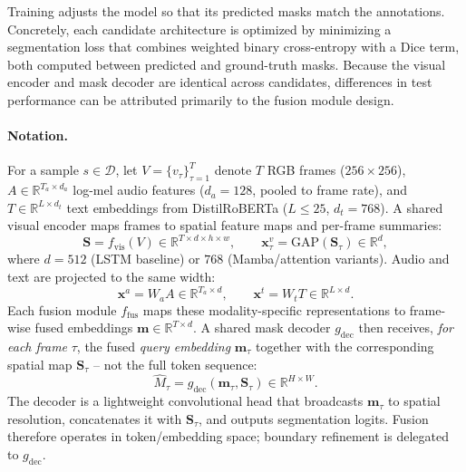 \documentclass[a4paper,12pt]{extarticle}
\begin{document}
Training adjusts the model so that its predicted masks match the annotations. Concretely, each candidate architecture is optimized by minimizing a segmentation loss that combines weighted binary cross-entropy with a Dice term, both computed between predicted and ground-truth masks. Because the visual encoder and mask decoder are identical across candidates, differences in test performance can be attributed primarily to the fusion module design.

\paragraph{Notation.}
For a sample $s \in \mathcal{D}$, let $V=\{v_\tau\}_{\tau=1}^{T}$ denote $T$ RGB frames ($256{\times}256$), $A \in \mathbb{R}^{T_a \times d_a}$ log-mel audio features ($d_a{=}128$, pooled to frame rate), and $T \in \mathbb{R}^{L \times d_t}$ text embeddings from DistilRoBERTa ($L{\le}25$, $d_t{=}768$). A shared visual encoder maps frames to spatial feature maps and per-frame summaries:
\begin{equation}
    \mathbf{S} = f_{\mathrm{vis}}(V) \in \mathbb{R}^{T \times d \times h \times w}, \qquad
    \mathbf{x}^{v}_\tau = \mathrm{GAP}(\mathbf{S}_\tau) \in \mathbb{R}^{d},
\end{equation}
where $d{=}512$ (LSTM baseline) or $768$ (Mamba/attention variants). Audio and text are projected to the same width:
\begin{equation}
    \mathbf{x}^{a} = W_a A \in \mathbb{R}^{T_a \times d}, \qquad
    \mathbf{x}^{t} = W_t T \in \mathbb{R}^{L \times d}.
\end{equation}
Each fusion module $f_{\mathrm{fus}}$ maps these modality-specific representations to frame-wise fused embeddings $\mathbf{m} \in \mathbb{R}^{T \times d}$. A shared mask decoder $g_{\mathrm{dec}}$ then receives, \emph{for each frame} $\tau$, the fused \emph{query embedding} $\mathbf{m}_\tau$ together with the corresponding spatial map $\mathbf{S}_\tau$ -- not the full token sequence:
\begin{equation}
    \hat{M}_\tau = g_{\mathrm{dec}}(\mathbf{m}_\tau, \mathbf{S}_\tau) \in \mathbb{R}^{H \times W}.
\end{equation}
The decoder is a lightweight convolutional head that broadcasts $\mathbf{m}_\tau$ to spatial resolution, concatenates it with $\mathbf{S}_\tau$, and outputs segmentation logits. Fusion therefore operates in token/embedding space; boundary refinement is delegated to $g_{\mathrm{dec}}$.
\end{document}
